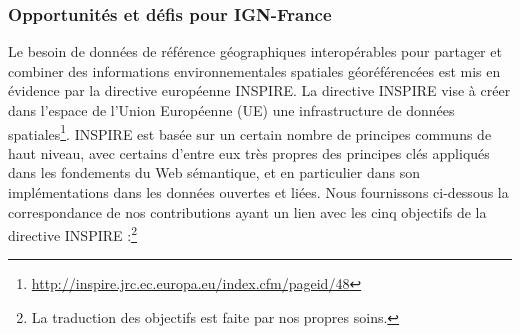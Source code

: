 \subsubsection*{Opportunit\'{e}s et d\'{e}fis pour IGN-France}
\label{sec:challenges}
Le besoin de donn\'{e}es de r\'{e}f\'{e}rence g\'{e}ographiques interop\'{e}rables pour partager et combiner des informations environnementales spatiales g\'{e}or\'{e}f\'{e}renc\'{e}es est mis en \'{e}vidence par la directive europ\'{e}enne INSPIRE. La directive INSPIRE vise \`{a} cr\'{e}er dans l'espace de l'Union Europ\'{e}enne (UE) une infrastructure de donn\'{e}es spatiales\footnote{\url{http://inspire.jrc.ec.europa.eu/index.cfm/pageid/48}}. INSPIRE est bas\'{e}e sur un certain nombre de principes communs de haut niveau, avec certains d'entre eux tr\`{e}s propres des principes cl\'{e}s appliqu\'{e}s dans les fondements du Web s\'{e}mantique, et en particulier dans son impl\'{e}mentations dans les donn\'{e}es ouvertes et li\'{e}es. Nous fournissons ci-dessous la correspondance de nos contributions ayant un lien avec les cinq objectifs de la directive INSPIRE :\footnote{La traduction des objectifs est faite par nos propres soins.}

